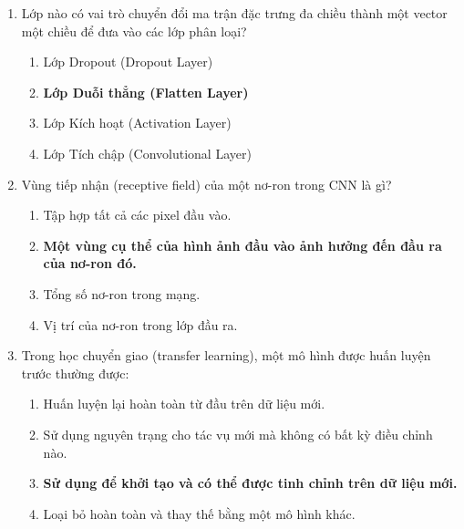 \documentclass{book}
\begin{document}
\begin{enumerate}
    \item Lớp nào có vai trò chuyển đổi ma trận đặc trưng đa chiều thành một vector một chiều để đưa vào các lớp phân loại?
    \begin{multicols}{2}
        \begin{enumerate}[label=\Alph*]
            \item Lớp Dropout (Dropout Layer)
            \item \textbf{Lớp Duỗi thẳng (Flatten Layer)}
            \item Lớp Kích hoạt (Activation Layer)
            \item Lớp Tích chập (Convolutional Layer)
        \end{enumerate}
    \end{multicols}

    \item Vùng tiếp nhận (receptive field) của một nơ-ron trong CNN là gì?
    \begin{multicols}{2}
        \begin{enumerate}[label=\Alph*]
            \item Tập hợp tất cả các pixel đầu vào.
            \item \textbf{Một vùng cụ thể của hình ảnh đầu vào ảnh hưởng đến đầu ra của nơ-ron đó.}
            \item Tổng số nơ-ron trong mạng.
            \item Vị trí của nơ-ron trong lớp đầu ra.
        \end{enumerate}
    \end{multicols}

    \item Trong học chuyển giao (transfer learning), một mô hình được huấn luyện trước thường được:
    \begin{multicols}{2}
        \begin{enumerate}[label=\Alph*]
            \item Huấn luyện lại hoàn toàn từ đầu trên dữ liệu mới.
            \item Sử dụng nguyên trạng cho tác vụ mới mà không có bất kỳ điều chỉnh nào.
            \item \textbf{Sử dụng để khởi tạo và có thể được tinh chỉnh trên dữ liệu mới.}
            \item Loại bỏ hoàn toàn và thay thế bằng một mô hình khác.
        \end{enumerate}
    \end{multicols}


\end{enumerate}
\end{document}
